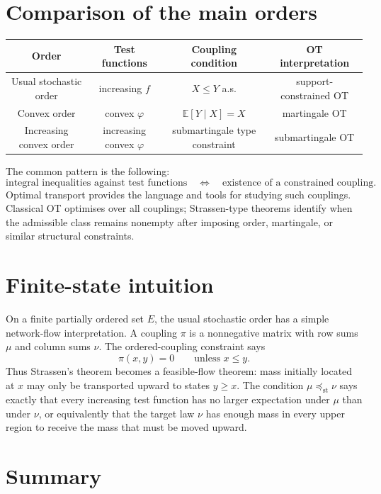 \documentclass[11pt]{article}
\newcommand{\E}{\mathbb E}
\begin{document}
\section{Comparison of the main orders}

\begin{center}
\begin{tabular}{c|c|c|c}
Order & Test functions & Coupling condition & OT interpretation \\
\hline
Usual stochastic order & increasing \(f\) & \(X\leq Y\) a.s. & support-constrained OT \\
Convex order & convex \(\varphi\) & \(\E[Y\mid X]=X\) & martingale OT \\
Increasing convex order & increasing convex \(\varphi\) & submartingale type constraint & submartingale OT
\end{tabular}
\end{center}

The common pattern is the following:
\[
        \text{integral inequalities against test functions}
        \quad\Longleftrightarrow\quad
        \text{existence of a constrained coupling}.
\]
Optimal transport provides the language and tools for studying such couplings.
Classical OT optimises over all couplings; Strassen-type theorems identify when
the admissible class remains nonempty after imposing order, martingale, or
similar structural constraints.

\section{Finite-state intuition}

On a finite partially ordered set \(E\), the usual stochastic order has a simple
network-flow interpretation. A coupling \(\pi\) is a nonnegative matrix with row
sums \(\mu\) and column sums \(\nu\). The ordered-coupling constraint says
\[
        \pi(x,y)=0
        \qquad
        \text{unless }x\leq y.
\]
Thus Strassen's theorem becomes a feasible-flow theorem: mass initially located
at \(x\) may only be transported upward to states \(y\geq x\). The condition
\(\mu\preceq_{\mathrm{st}}\nu\) says exactly that every increasing test function
has no larger expectation under \(\mu\) than under \(\nu\), or equivalently that
the target law \(\nu\) has enough mass in every upper region to receive the mass
that must be moved upward.

\section{Summary}
\end{document}
